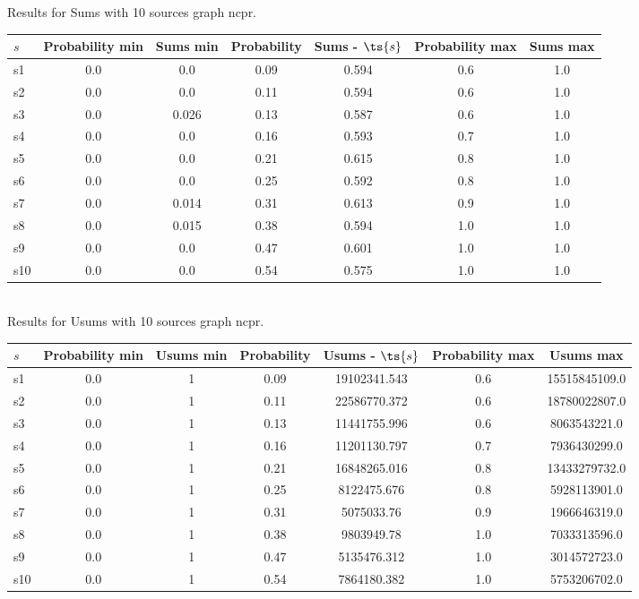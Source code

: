 \documentclass{article}
\begin{document}
\noindent Results for Sums with 10 sources graph ncpr.

\noindent\begin{tabular}{|l|c|c|c|c|c|c|}
\hline
$s$& Probability min & Sums min & Probability & Sums - $\ts{s}$ & Probability max & Sums max\\
\hline
s1 &0.0 & 0.0 & 0.09 & 0.594 & 0.6 & 1.0\\
\hline
s2 &0.0 & 0.0 & 0.11 & 0.594 & 0.6 & 1.0\\
\hline
s3 &0.0 & 0.026 & 0.13 & 0.587 & 0.6 & 1.0\\
\hline
s4 &0.0 & 0.0 & 0.16 & 0.593 & 0.7 & 1.0\\
\hline
s5 &0.0 & 0.0 & 0.21 & 0.615 & 0.8 & 1.0\\
\hline
s6 &0.0 & 0.0 & 0.25 & 0.592 & 0.8 & 1.0\\
\hline
s7 &0.0 & 0.014 & 0.31 & 0.613 & 0.9 & 1.0\\
\hline
s8 &0.0 & 0.015 & 0.38 & 0.594 & 1.0 & 1.0\\
\hline
s9 &0.0 & 0.0 & 0.47 & 0.601 & 1.0 & 1.0\\
\hline
s10 &0.0 & 0.0 & 0.54 & 0.575 & 1.0 & 1.0\\
\hline
\end{tabular}\\

\noindent Results for Usums with 10 sources graph ncpr.

\noindent\begin{tabular}{|l|c|c|c|c|c|c|}
\hline
$s$& Probability min & Usums min & Probability & Usums - $\ts{s}$ & Probability max & Usums max\\
\hline
s1 &0.0 & 1 & 0.09 & 19102341.543 & 0.6 & 15515845109.0\\
\hline
s2 &0.0 & 1 & 0.11 & 22586770.372 & 0.6 & 18780022807.0\\
\hline
s3 &0.0 & 1 & 0.13 & 11441755.996 & 0.6 & 8063543221.0\\
\hline
s4 &0.0 & 1 & 0.16 & 11201130.797 & 0.7 & 7936430299.0\\
\hline
s5 &0.0 & 1 & 0.21 & 16848265.016 & 0.8 & 13433279732.0\\
\hline
s6 &0.0 & 1 & 0.25 & 8122475.676 & 0.8 & 5928113901.0\\
\hline
s7 &0.0 & 1 & 0.31 & 5075033.76 & 0.9 & 1966646319.0\\
\hline
s8 &0.0 & 1 & 0.38 & 9803949.78 & 1.0 & 7033313596.0\\
\hline
s9 &0.0 & 1 & 0.47 & 5135476.312 & 1.0 & 3014572723.0\\
\hline
s10 &0.0 & 1 & 0.54 & 7864180.382 & 1.0 & 5753206702.0\\
\hline
\end{tabular}\\
\end{document}
